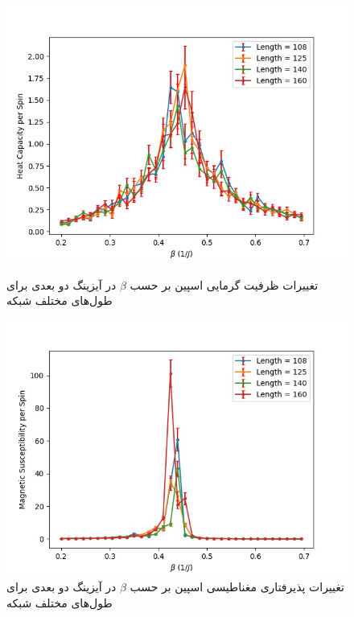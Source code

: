 \documentclass[11pt, a4paper]{article}
\begin{document}
\begin{figure}[h!]
\begin{minipage}[b]{0.48\textwidth}
  \end{minipage}
  \begin{minipage}[b]{0.48\textwidth}
    \includegraphics[width=\textwidth]{ising_render_data_c[108, 125, 140, 160]_0.2_0.695_0.015_100.jpg}
    \caption{تغییرات ظرفیت گرمایی اسپین‌ بر حسب $\beta$ در آیزینگ دو بعدی برای طول‌های مختلف شبکه}
    \label{fig:ising_c}
  \end{minipage}
  \hfill
  \begin{minipage}[b]{0.48\textwidth}
    \includegraphics[width=\textwidth]{ising_render_data_x[108, 125, 140, 160]_0.2_0.695_0.015_100.jpg}
    \caption{تغییرات پذیرفتاری مغناطیسی اسپین‌ بر حسب $\beta$ در آیزینگ دو بعدی برای طول‌های مختلف شبکه}
    \label{fig:ising_x}

\end{minipage}
\end{figure}
\end{document}
